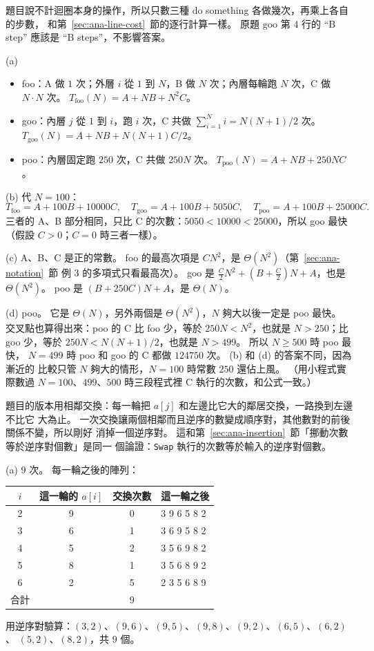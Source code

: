 題目說不計迴圈本身的操作，所以只數三種 do something 各做幾次，再乘上各自的步數，
和第~\ref{sec:ana-line-cost}~節的逐行計算一樣。 原題 goo 第 4 行的 ``B step'' 應該是
``B steps''，不影響答案。

(a)
\begin{itemize}
\item foo：A 做 $1$ 次；外層 $i$ 從 $1$ 到 $N$，B 做 $N$ 次；內層每輪跑 $N$ 次，C 做
$N \cdot N$ 次。 $T_{\mathrm{foo}}(N) = A + NB + N^2 C$。
\item goo：內層 $j$ 從 $1$ 到 $i$，跑 $i$ 次，C 共做
$\sum_{i=1}^{N} i = N(N+1)/2$ 次。 $T_{\mathrm{goo}}(N) = A + NB + N(N+1)C/2$。
\item poo：內層固定跑 $250$ 次，C 共做 $250N$ 次。
$T_{\mathrm{poo}}(N) = A + NB + 250NC$。
\end{itemize}

(b) 代 $N = 100$：
\[
T_{\mathrm{foo}} = A + 100B + 10000C,\quad
T_{\mathrm{goo}} = A + 100B + 5050C,\quad
T_{\mathrm{poo}} = A + 100B + 25000C .
\]
三者的 A、B 部分相同，只比 C 的次數：$5050 < 10000 < 25000$，所以 goo 最快（假設
$C > 0$；$C = 0$ 時三者一樣）。

(c) A、B、C 是正的常數。 foo 的最高次項是 $CN^2$，是 $\Theta(N^2)$（第~\ref{sec:ana-notation}~節
例 3 的多項式只看最高次）。 goo 是 $\frac{C}{2}N^2 + (B + \frac{C}{2})N + A$，也是
$\Theta(N^2)$。 poo 是 $(B + 250C)N + A$，是 $\Theta(N)$。

(d) poo。 它是 $\Theta(N)$，另外兩個是 $\Theta(N^2)$，$N$ 夠大以後一定是 poo 最快。
交叉點也算得出來：poo 的 C 比 foo 少，等於 $250N < N^2$，也就是 $N > 250$；比 goo
少，等於 $250N < N(N+1)/2$，也就是 $N > 499$。 所以 $N \ge 500$ 時 poo 最快，
$N = 499$ 時 poo 和 goo 的 C 都做 $124750$ 次。 (b) 和 (d) 的答案不同，因為漸近的
比較只管 $N$ 夠大的情形，$N = 100$ 時常數 $250$ 還佔上風。 （用小程式實際數過
$N = 100$、$499$、$500$ 時三段程式裡 C 執行的次數，和公式一致。）

題目的版本用相鄰交換：每一輪把 $a[j]$ 和左邊比它大的鄰居交換，一路換到左邊不比它
大為止。 一次交換讓兩個相鄰而且逆序的數變成順序對，其他數對的前後關係不變，所以剛好
消掉一個逆序對。 這和第~\ref{sec:ana-insertion}~節「挪動次數等於逆序對個數」是同一
個論證：\texttt{Swap} 執行的次數等於輸入的逆序對個數。

(a) $9$ 次。 每一輪之後的陣列：
\begin{center}
\begin{tabular}{cccl}
\toprule
$i$ & 這一輪的 $a[i]$ & 交換次數 & 這一輪之後 \\
\midrule
2 & 9 & 0 & 3 9 6 5 8 2 \\
3 & 6 & 1 & 3 6 9 5 8 2 \\
4 & 5 & 2 & 3 5 6 9 8 2 \\
5 & 8 & 1 & 3 5 6 8 9 2 \\
6 & 2 & 5 & 2 3 5 6 8 9 \\
\midrule
合計 & & 9 & \\
\bottomrule
\end{tabular}
\end{center}
用逆序對驗算：$(3,2)$、$(9,6)$、$(9,5)$、$(9,8)$、$(9,2)$、$(6,5)$、$(6,2)$、
$(5,2)$、$(8,2)$，共 $9$ 個。

